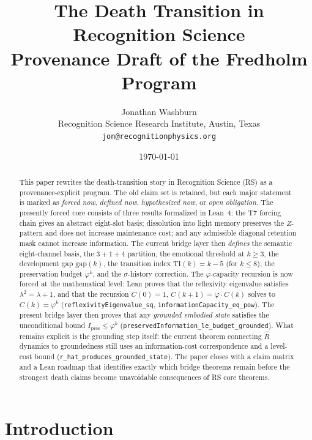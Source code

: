 \documentclass[11pt,a4paper]{article}
\title{\textbf{The Death Transition in Recognition Science}\\[0.4em]
\large Provenance Draft of the Fredholm Program}
\author{Jonathan Washburn\\
\small Recognition Science Research Institute, Austin, Texas\\
\small \texttt{jon@recognitionphysics.org}}
\date{\today}
\theoremstyle{definition}
\newcommand{\phig}{\varphi}
\newcommand{\Rhat}{\hat{R}}
\newcommand{\Zp}{Z}
\newcommand{\gapdim}{\mathrm{gap}}
\newcommand{\tidx}{\mathrm{TI}}
\newcommand{\code}[1]{\texttt{\small #1}}
\begin{document}
\maketitle

\begin{abstract}
This paper rewrites the death-transition story in Recognition Science (RS)
as a provenance-explicit program.  The old claim set is retained, but each
major statement is marked as \emph{forced now}, \emph{defined now},
\emph{hypothesized now}, or \emph{open obligation}.  The presently forced
core consists of three results formalized in Lean~4: the T7 forcing chain
gives an abstract eight-slot basis; dissolution into light memory preserves
the $\Zp$-pattern and does not increase maintenance cost; and any admissible
diagonal retention mask cannot increase information.  The current bridge
layer then \emph{defines} the semantic eight-channel basis, the $3+1+4$
partition, the emotional threshold at $k \ge 3$, the development gap
$\gapdim(k)$, the transition index $\tidx(k)=k-5$ (for $k \le 8$), the
preservation budget $\phig^k$, and the $\sigma$-history correction.
The $\phig$-capacity recursion is now forced at the mathematical level:
Lean proves that the reflexivity eigenvalue satisfies
$\lambda^2=\lambda+1$, and that the recursion
$C(0)=1$, $C(k{+}1)=\phig \cdot C(k)$ solves to $C(k)=\phig^k$
(\code{reflexivityEigenvalue\_sq},
\code{informationCapacity\_eq\_pow}).  The present bridge layer then proves
that any \emph{grounded embodied state} satisfies the unconditional bound
$I_{\mathrm{pres}} \le \phig^k$
(\code{preservedInformation\_le\_budget\_grounded}).  What remains explicit
is the grounding step itself: the current theorem connecting $\Rhat$
dynamics to groundedness still uses an information-cost correspondence and a
level-cost bound (\code{r\_hat\_produces\_grounded\_state}).  The paper
closes with a claim matrix and a Lean roadmap that identifies exactly which
bridge theorems remain before the strongest death claims become unavoidable
consequences of RS core theorems.
\end{abstract}

\tableofcontents

\section{Introduction}
\label{sec:intro}
\end{document}
